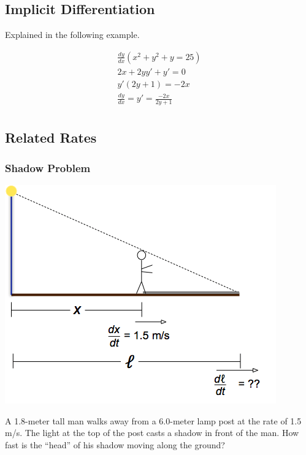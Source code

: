 \subsection{Implicit Differentiation}\label{subsec:implicit-differentiation}

\begin{center}
    Explained in the following example.
\end{center}

\begin{gather*}
    \frac{dy}{dx}(x^2+y^2+y=25)\\
    2x+2yy'+y'=0\\
    y'(2y+1)=-2x\\
    \frac{dy}{dx}=y'=\frac{-2x}{2y+1}\\
\end{gather*}

\subsection{Related Rates}

\subsubsection{Shadow Problem}

\begin{center}
    \includegraphics[scale=0.5]{figures/rr_shadow_ov.png}
\end{center}

A 1.8-meter tall man walks away from a 6.0-meter lamp post at the rate of 1.5 m/s. 
The light at the top of the post casts a shadow in front of the man. 
How fast is the “head” of his shadow moving along the ground?


